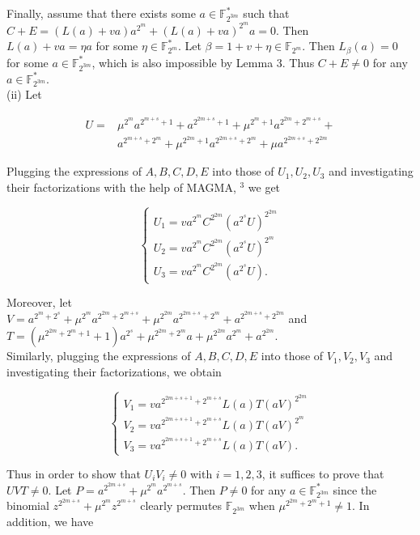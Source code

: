 \documentclass[10pt]{article}
\begin{document}
Finally, assume that there exists some $a \in \mathbb{F}_{2^{3 m}}^{*}$ such that $C+E=(L(a)+v a) a^{2^{m}}+(L(a)+v a)^{2^{m}} a=0$. Then\\
$L(a)+v a=\eta a$ for some $\eta \in \mathbb{F}_{2^{m}}^{*}$. Let $\beta=1+v+\eta \in \mathbb{F}_{2^{m}}$. Then $L_{\beta}(a)=0$ for some $a \in \mathbb{F}_{2^{3 m}}^{*}$, which is also impossible by Lemma 3. Thus $C+E \neq 0$ for any $a \in \mathbb{F}_{2^{3 m}}^{*}$.\\
(ii) Let

$$
\begin{aligned}
U= & \mu^{2^{m}} a^{2^{m+s}+1}+a^{2^{2 m+s}+1}+\mu^{2^{m}+1} a^{2^{2 m}+2^{m+s}}+ \\
& a^{2^{m+s}+2^{m}}+\mu^{2^{2 m}+1} a^{2^{2 m+s}+2^{m}}+\mu a^{2^{2 m+s}+2^{2 m}}
\end{aligned}
$$

Plugging the expressions of $A, B, C, D, E$ into those of $U_{1}, U_{2}, U_{3}$ and investigating their factorizations with the help of MAGMA, ${ }^{3}$ we get

\[
\left\{\begin{array}{l}
U_{1}=v a^{2^{m}} C^{2^{2 m}}\left(a^{2^{s}} U\right)^{2^{2 m}}  \tag{13}\\
U_{2}=v a^{2^{m}} C^{2^{2 m}}\left(a^{2^{s}} U\right)^{2^{m}} \\
U_{3}=v a^{2^{m}} C^{2^{2 m}}\left(a^{2^{s}} U\right) .
\end{array}\right.
\]

Moreover, let\\
$V=a^{2^{m}+2^{s}}+\mu^{2^{m}} a^{2^{2 m}+2^{m+s}}+\mu^{2^{2 m}} a^{2^{2 m+s}+2^{m}}+a^{2^{2 m+s}+2^{2 m}}$ and\\
$T=\left(\mu^{2^{2 m}+2^{m}+1}+1\right) a^{2^{s}}+\mu^{2^{2 m}+2^{m}} a+\mu^{2^{2 m}} a^{2^{m}}+a^{2^{2 m}}$.\\
Similarly, plugging the expressions of $A, B, C, D, E$ into those of $V_{1}, V_{2}, V_{3}$ and investigating their factorizations, we obtain

\[
\left\{\begin{array}{l}
V_{1}=v a^{2^{2 m+s+1}+2^{m+s}} L(a) T(a V)^{2^{2 m}}  \tag{14}\\
V_{2}=v a^{2^{2 m+s+1}+2^{m+s}} L(a) T(a V)^{2^{m}} \\
V_{3}=v a^{2^{2 m+s+1}+2^{m+s}} L(a) T(a V) .
\end{array}\right.
\]

Thus in order to show that $U_{i} V_{i} \neq 0$ with $i=1,2,3$, it suffices to prove that $U V T \neq 0$. Let $P=a^{2^{2 m+s}}+\mu^{2^{m}} a^{2^{m+s}}$. Then $P \neq 0$ for any $a \in \mathbb{F}_{2^{3 m}}^{*}$ since the binomial $z^{2^{2 m+s}}+ \mu^{2^{m}} z^{2^{m+s}}$ clearly permutes $\mathbb{F}_{2^{3 m}}$ when $\mu^{2^{2 m}+2^{m}+1} \neq 1$. In addition, we have
\end{document}

